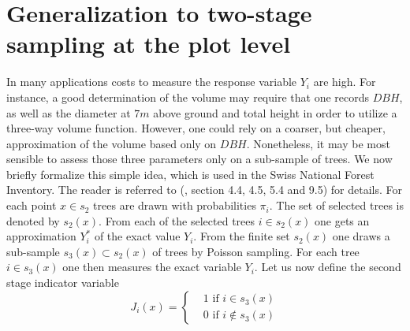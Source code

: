 \documentclass[a4paper,12pt,leqno, titlepage]{article}
\begin{document}
\section{Generalization to two-stage sampling at the plot level}
In many applications costs to measure the response variable $Y_i$ are high. For instance,
a good determination of the volume may require that one records
$DBH$, as well as the diameter at $7m$ above ground and total height
in order to utilize a three-way volume function. However, one could rely
on a coarser, but cheaper, approximation of the volume based only on
$DBH$. Nonetheless, it may be most sensible to assess those three
parameters only on a sub-sample of trees. We now briefly formalize this
simple idea, which is used in the Swiss National Forest Inventory. The reader is referred to (\cite{mandallaz}, section 4.4, 4.5, 5.4 and 9.5) for details. For each point $x\in{s_2}$ trees are drawn with
probabilities $\pi_i$. The set of selected trees is denoted by
$s_{2}(x)$. From each of the selected trees $i\in{s_{2}(x)}$ one
gets an approximation $Y_i^*$ of the exact value $Y_i$. From the
finite set $s_{2}(x)$ one draws a sub-sample
$s_{3}(x)\subset{s_{2}(x)}$ of trees by Poisson sampling. For each tree $i\in{s_{3}(x)}$
one then measures the exact variable $Y_i$. Let us now define the
second stage indicator variable
\begin{equation}
 J_i(x)=\begin{cases}&1 \text{ if $i\in s_{3}(x)$}\\
                      &0 \text{ if $i\not\in s_{3}(x)$}
         \end{cases}
\end{equation}
\end{document}
